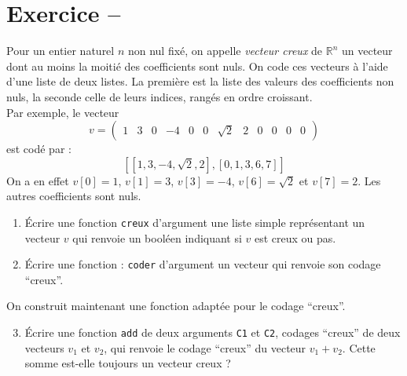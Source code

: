 \section{Exercice -- }

Pour un entier naturel $n$ non nul fixé, on appelle \textit{vecteur creux} de $\mathbb{R}^n$ un vecteur dont au moins la moitié des coefficients sont nuls. On code ces vecteurs à l'aide d'une liste de deux listes. La première est la liste des valeurs des coefficients non nuls, la seconde celle de leurs indices, rangés en ordre croissant.\\
Par exemple, le vecteur
$$v=\left( \begin{array}{cccccccccccc}
1 & 3 & 0 & -4 & 0 & 0 & \sqrt{2} & 2 & 0 & 0 & 0 & 0
\end{array}\right)$$ est codé par : $$ [[1,3,-4,\sqrt{2},2],[0,1,3,6,7]]$$
On a en effet $v[0]=1$, $v[1]=3$, $v[3]=-4$, $v[6]=\sqrt{2}$ et $v[7]=2$. Les autres coefficients sont nuls.
\begin{enumerate}
\item \'Ecrire une fonction \texttt{creux} d'argument une liste simple représentant un vecteur $v$ qui renvoie un booléen indiquant si $v$ est creux ou pas.
\item \'Ecrire une fonction : \texttt{coder} d'argument un vecteur qui renvoie son codage ``creux''.%
\end{enumerate}
On construit maintenant une fonction adaptée pour le codage ``creux''.
\begin{enumerate}
\setcounter{enumi}{2}
\item \'Ecrire une fonction \texttt{add} de deux arguments \texttt{C1} et \texttt{C2}, codages ``creux'' de deux vecteurs $v_1$ et $v_2$, qui renvoie le codage ``creux'' du vecteur $v_1+v_2$. Cette somme est-elle toujours un vecteur creux ?
\end{enumerate}






